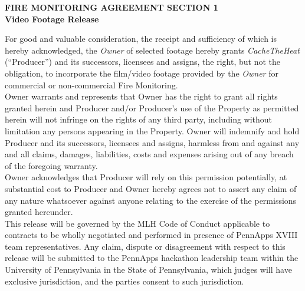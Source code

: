 \documentclass[12pt]{article}
\newcommand*{\SignatureAndDate}[1]{%
    \par\noindent\makebox[2.5in]{\hrulefill} \hfill\makebox[2.0in]{\hrulefill}%
    \par\noindent\makebox[2.5in][l]{#1}      \hfill\makebox[2.0in][l]{Date}%
}%
\begin{document}
\begin{center}
\textbf{FIRE MONITORING AGREEMENT SECTION 1}\\
\vspace{10pt}
\textbf{Video Footage Release}
\end{center}

\vspace{15pt}

For good and valuable consideration, the receipt and sufficiency of which is hereby acknowledged, the \emph{Owner} of selected footage hereby grants \emph{CacheTheHeat} (``Producer'') and its successors, licensees and assigns, the right, but not the obligation, to incorporate the film/video footage provided by the \emph{Owner} for commercial or non-commercial Fire Monitoring.\\

Owner warrants and represents that Owner has the right to grant all rights granted herein and Producer and/or Producer's use of the Property as permitted herein will not infringe on the rights of any third party, including without limitation any persons appearing in the Property. Owner will indemnify and hold Producer and its successors, licensees and assigns, harmless from and against any and all claims, damages, liabilities, costs and expenses arising out of any breach of the foregoing warranty.\\

Owner acknowledges that Producer will rely on this permission potentially, at substantial cost to Producer and Owner hereby agrees not to assert any claim of any nature whatsoever against anyone relating to the exercise of the permissions granted hereunder.\\

This release will be governed by the MLH Code of Conduct applicable to contracts to be wholly negotiated and performed in presence of PennApps XVIII team representatives. Any claim, dispute or disagreement with respect to this release will be submitted to the PennApps hackathon leadership team within the University of Pennsylvania in the State of Pennsylvania, which judges will have exclusive jurisdiction, and the parties consent to such jurisdiction. 




\vspace{1in}


\SignatureAndDate{Owner}
\end{document}
